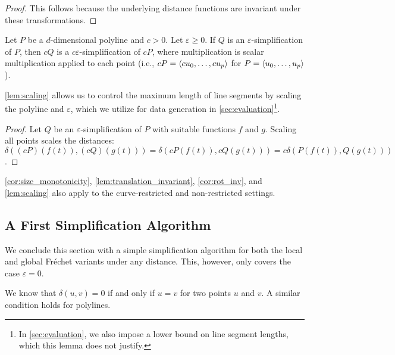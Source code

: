 \begin{proof}
	This follows because the underlying distance functions are invariant under these transformations.
\end{proof}

\begin{lemma}\label{lem:scaling}
	Let \(P\) be a \(d\)-dimensional polyline and \(c > 0\). Let \(\varepsilon \geq 0\). If \(Q\) is an \(\varepsilon\)-simplification of \(P\), then \(cQ\) is a \(c\varepsilon\)-simplification of \(cP\), where multiplication is scalar multiplication applied to each point (i.e., \(cP = \left\langle cu_0, \dots, cu_p\right\rangle\) for \(P = \left\langle u_0,\dots, u_p\right\rangle\)).
\end{lemma}

\cref{lem:scaling} allows us to control the maximum length of line segments by scaling the polyline and \(\varepsilon\), which we utilize for data generation in \cref{sec:evaluation}\footnote{In \cref{sec:evaluation}, we also impose a lower bound on line segment lengths, which this lemma does not justify.}.

\begin{proof}
	Let \(Q\) be an \(\varepsilon\)-simplification of \(P\) with suitable functions \(f\) and \(g\). Scaling all points scales the distances: \(\delta((cP)(f(t)), (cQ)(g(t))) = \delta(cP(f(t)), cQ(g(t))) = c\delta(P(f(t)), Q(g(t)))\).
\end{proof}

\begin{remark}
	\cref{cor:size_monotonicity}, \cref{lem:translation_invariant}, \cref{cor:rot_inv}, and \cref{lem:scaling} also apply to the curve-restricted and non-restricted settings.
\end{remark}

\subsection{A First Simplification Algorithm}
We conclude this section with a simple simplification algorithm for both the local and global Fréchet variants under any distance. This, however, only covers the case \(\varepsilon = 0\).

We know that \(\delta(u, v) = 0\) if and only if \(u = v\) for two points \(u\) and \(v\). A similar condition holds for polylines.

